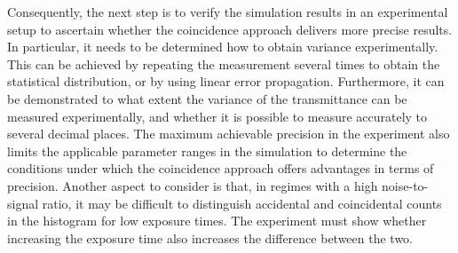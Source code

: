 Consequently, the next step is to verify the simulation results in an experimental setup to ascertain whether the coincidence approach delivers more precise results. In particular, it needs to be determined how to obtain variance experimentally. This can be achieved by repeating the measurement several times to obtain the statistical distribution, or by using linear error propagation.  \newline
Furthermore, it can be demonstrated to what extent the variance of the transmittance can be measured experimentally, and whether it is possible to measure accurately to several decimal places. The maximum achievable precision in the experiment also limits the applicable parameter ranges in the simulation to determine the conditions under which the coincidence approach offers advantages in terms of precision. \newline
Another aspect to consider is that, in regimes with a high noise-to-signal ratio, it may be difficult to distinguish accidental and coincidental counts in the histogram for low exposure times. The experiment must show whether increasing the exposure time also increases the difference between the two. 


